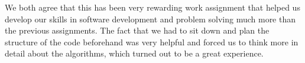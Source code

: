 \documentclass{article}
\begin{document}
We both agree that this has been very rewarding work assignment that helped us develop our skills in software development and problem solving much more than the previous assignments. The fact that we had to sit down and plan the structure of the code beforehand was very helpful and forced us to think more in detail about the algorithms, which turned out to be a great experience. 


\end{document}
